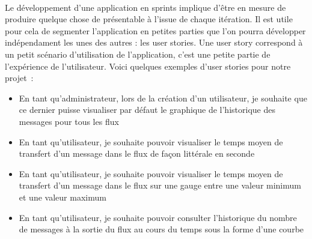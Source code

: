 			\paragraph{}%
			Le développement d'une application en sprints implique d'être en mesure de
			produire quelque chose de présentable à l'issue de chaque itération.
			Il est utile pour cela de segmenter l'application en petites parties que
			l'on pourra développer indépendament les unes des autres : les user stories.
			Une user story correspond à un petit scénario d'utilisation de
			l'application, c'est une petite partie de l'expérience de l'utilisateur.
			Voici quelques exemples d'user stories pour notre projet~:
			\begin{itemize}
			  \item En tant qu'administrateur, lors de la création d'un utilisateur, je
			  souhaite que ce dernier puisse visualiser par défaut le graphique de
			  l'historique des messages pour tous les flux
			  \item En tant qu'utilisateur, je souhaite pouvoir visualiser le temps moyen
			  de transfert d'un message dans le flux de façon littérale en seconde
			  \item En tant qu'utilisateur, je souhaite pouvoir visualiser le temps
			  moyen de transfert d'un message dans le flux sur une gauge entre une
			  valeur minimum et une valeur maximum
			  \item En tant qu'utilisateur, je souhaite pouvoir consulter l'historique du
			  nombre de messages à la sortie du flux au cours du temps sous la forme
			  d'une courbe
			\end{itemize}
			
